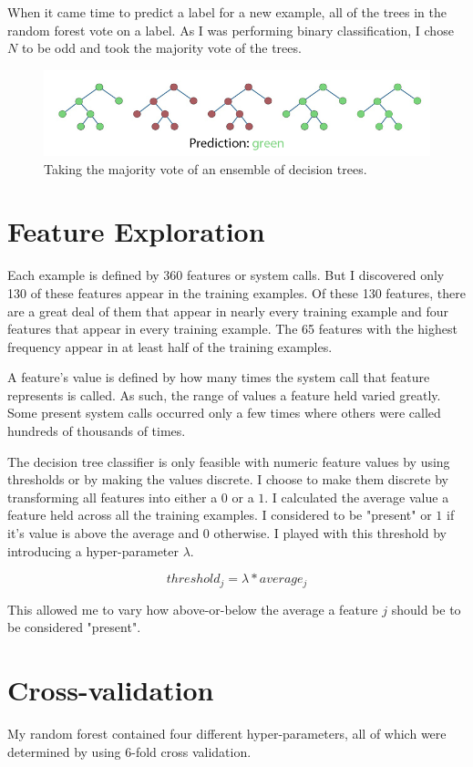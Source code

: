 \documentclass[a4paper, 11pt]{article} %
\begin{document}
When it came time to predict a label for a new example, all of the trees in the random forest vote on a label. As I was performing binary classification, I chose $N$ to be odd and took the majority vote of the trees.

\begin{figure} [H]
  \centerline{\includegraphics[width=0.8\linewidth]{decision_tree.png}}
  \caption{Taking the majority vote of an ensemble of decision trees.}
\end{figure}

\section*{Feature Exploration}

Each example is defined by 360 features or system calls. But I discovered only 130 of these features appear in the training examples. Of these 130 features, there are a great deal of them that appear in nearly every training example and four features that appear in every training example. The 65 features with the highest frequency appear in at least half of the training examples.

A feature's value is defined by how many times the system call that feature represents is called. As such, the range of values a feature held varied greatly. Some present system calls occurred only a few times where others were called hundreds of thousands of times.

The decision tree classifier is only feasible with numeric feature values by using thresholds or by making the values discrete. I choose to make them discrete by transforming all features into either a $0$ or a $1$. I calculated the average value a feature held across all the training examples. I considered to be "present" or $1$ if it's value is above the average and $0$ otherwise. I played with this threshold by introducing a hyper-parameter $\lambda$.

$$threshold_j = \lambda * average_j$$

This allowed me to vary how above-or-below the average a feature $j$ should be to be considered "present".

\section*{Cross-validation}
My random forest contained four different hyper-parameters, all of which were determined by using 6-fold cross validation.
\end{document}
